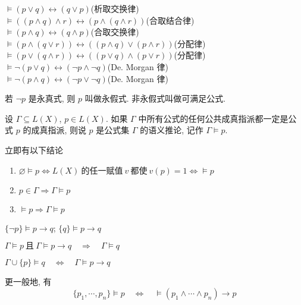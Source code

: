\documentclass[
    mode=hazy,
    color=blue,
    device=normal,
    lang=cn
]{elegantnote}
\begin{document}
$\vDash (p\lor q)\leftrightarrow(q\lor p)$\hfill(析取交换律)\\
$\vDash ((p\land q)\land r)\leftrightarrow(p\land(q\land r))$\hfill(合取结合律)\\
$\vDash (p\land q)\leftrightarrow(q\land p)$\hfill(合取交换律)\\
$\vDash (p\land(q\lor r))\leftrightarrow((p\land q)\lor(p\land r))$\hfill(分配律)\\
$\vDash (p\lor (q\land r))\leftrightarrow((p\lor q)\land (p\lor r))$\hfill(分配律)\\
$\vDash \lnot(p\lor q)\leftrightarrow(\lnot p\land\lnot q)$\hfill(De. Morgan 律)\\
$\vDash \lnot(p\land q)\leftrightarrow(\lnot p\lor\lnot q)$\hfill(De. Morgan 律)\\
\begin{definition}[永假式与可满足公式]
    若 $\lnot p$ 是永真式, 则 $p$ 叫做永假式. 非永假式叫做可满足公式.
\end{definition}
\begin{definition}[语义推论]
    设 $\Gamma \subseteq L(X)$, $p\in L(X)$. 如果 $\Gamma$ 中所有公式的任何公共成真指派都一定是公式 $p$ 的成真指派, 则说 $p$ 是公式集 $\Gamma$ 的语义推论, 记作 $\Gamma\vDash p$.
\end{definition}
立即有以下结论
\begin{enumerate}[label = $\arabic*^\circ$]
    \item $\varnothing\vDash p\Leftrightarrow L(X)\ \text{的任一赋值}\ v\ \text{都使}\ v(p)=1\Leftrightarrow\vDash p$
    \item $p\in\Gamma\Rightarrow\Gamma\vDash p$
    \item $\vDash p\Rightarrow\Gamma\vDash p$
\end{enumerate}
\begin{proposition}
    $\{\lnot p\}\vDash p\to q$; $\{q\}\vDash p\to q$
\end{proposition}
\begin{proposition}
    $\Gamma\vDash p\ \text{且}\ \Gamma\vDash p\to q\quad\Rightarrow\quad\Gamma\vDash q$
\end{proposition}
\begin{proposition}[语义演绎定理]
    $\Gamma\cup\{p\}\vDash q\quad\Leftrightarrow\quad\Gamma\vDash p\to q$
\end{proposition}
更一般地, 有
$$
    \{p_1,\cdots,p_n\}\vDash p\quad\Leftrightarrow\quad \vDash(p_1\land\cdots\land p_n)\to p
$$
\end{document}
